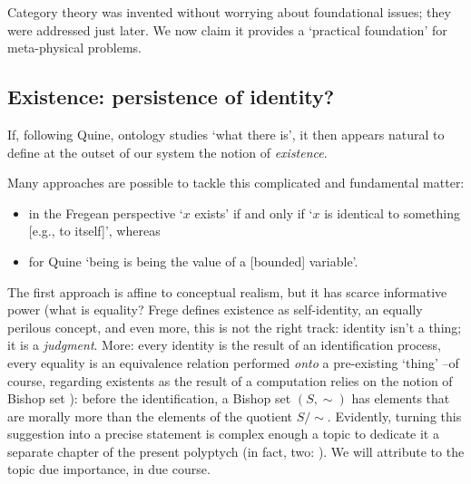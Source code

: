 Category theory was invented without worrying about foundational issues; they were addressed just later. We now claim it provides a `practical foundation' for meta\hyp{}physical problems.%
\subsection{Existence: persistence of identity?} \label{existence}
If, following Quine, ontology studies `what there is', it then appears natural to define at the outset of our system the notion of \emph{existence}.

Many approaches are possible to tackle this complicated and fundamental matter:
\begin{itemize}
	\item in the Fregean perspective \cite{Frege} `$x$ exists' if and only if `$x$ is identical to something [e.g., to itself]', whereas
	\item for Quine \cite{Qui53} `being is being the value of a [bounded] variable'.
\end{itemize}
The first approach is affine to conceptual realism, but it has scarce informative power (what is equality? Frege defines existence as self-identity, an equally perilous concept, and even more, this is not the right track: identity isn't a thing; it is a \emph{judgment}. More: every identity is the result of an identification process, every equality is an equivalence relation performed \emph{onto} a pre-existing `thing' --of course, regarding existents as the result of a computation relies on the notion of Bishop set \cite{Bis67,hofmann2012extensional}): before the identification, a Bishop set $(S,\sim)$ has elements that are morally more than the elements of the quotient $S/\!\sim$. Evidently, turning this suggestion into a precise statement is complex enough a topic to dedicate it a separate chapter of the present polyptych (in fact, two: \cite{black,homot}). We will attribute to the topic due importance, in due course.

